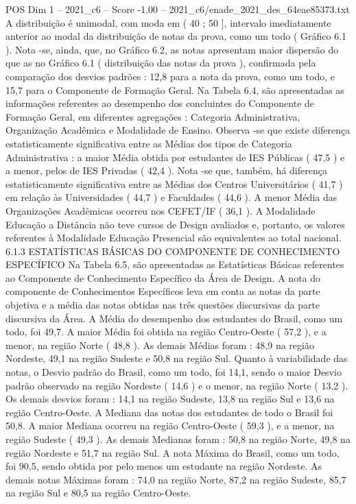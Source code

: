 \begin{textsample}{POS Dim 1 – 2021\_c6 – Score -1.00 – 2021\_c6/enade\_2021\_des\_64eae85373.txt}
A distribuição é unimodal, com moda em ( 40 ; 50 ], intervalo imediatamente anterior ao modal da distribuição de notas da prova, como um todo ( Gráfico 6.1 ).
Nota -se, ainda, que, no Gráfico 6.2, as notas apresentam maior dispersão do que as no Gráfico 6.1 ( distribuição das notas da prova ), confirmada pela comparação dos desvios padrões : 12,8 para a nota da prova, como um todo, e 15,7 para o Componente de Formação Geral.
Na Tabela 6.4, são apresentadas as informações referentes ao desempenho dos concluintes do Componente de Formação Geral, em diferentes agregações : Categoria Administrativa, Organização Acadêmica e Modalidade de Ensino.
Observa -se que existe diferença estatisticamente significativa entre as Médias dos tipos de Categoria Administrativa : a maior Média obtida por estudantes de IES Públicas ( 47,5 ) e a menor, pelos de IES Privadas ( 42,4 ).
Nota -se que, também, há diferença estatisticamente significativa entre as Médias dos Centros Universitários ( 41,7 ) em relação às Universidades ( 44,7 ) e Faculdades ( 44,6 ).
A menor Média das Organizações Acadêmicas ocorreu nos CEFET/IF ( 36,1 ).
A Modalidade Educação a Distância não teve cursos de Design avaliados e, portanto, os valores referentes à Modalidade Educação Presencial são equivalentes ao total nacional. 6.1.3 ESTATÍSTICAS BÁSICAS DO COMPONENTE DE CONHECIMENTO ESPECÍFICO Na Tabela 6.5, são apresentadas as Estatísticas Básicas referentes ao Componente de Conhecimento Específico da Área de Design.
A nota do componente de Conhecimentos Específicos leva em conta as notas da parte objetiva e a média das notas obtidas nas três questões discursivas da parte discursiva da Área.
A Média do desempenho dos estudantes do Brasil, como um todo, foi 49,7.
A maior Média foi obtida na região Centro-Oeste ( 57,2 ), e a menor, na região Norte ( 48,8 ).
As demais Médias foram : 48,9 na região Nordeste, 49,1 na região Sudeste e 50,8 na região Sul.
Quanto à variabilidade das notas, o Desvio padrão do Brasil, como um todo, foi 14,1, sendo o maior Desvio padrão observado na região Nordeste ( 14,6 ) e o menor, na região Norte ( 13,2 ).
Os demais desvios foram : 14,1 na região Sudeste, 13,8 na região Sul e 13,6 na região Centro-Oeste.
A Mediana das notas dos estudantes de todo o Brasil foi 50,8.
A maior Mediana ocorreu na região Centro-Oeste ( 59,3 ), e a menor, na região Sudeste ( 49,3 ).
As demais Medianas foram : 50,8 na região Norte, 49,8 na região Nordeste e 51,7 na região Sul.
A nota Máxima do Brasil, como um todo, foi 90,5, sendo obtida por pelo menos um estudante na região Nordeste.
As demais notas Máximas foram : 74,0 na região Norte, 87,2 na região Sudeste, 85,7 na região Sul e 80,5 na região Centro-Oeste.

\end{textsample}
